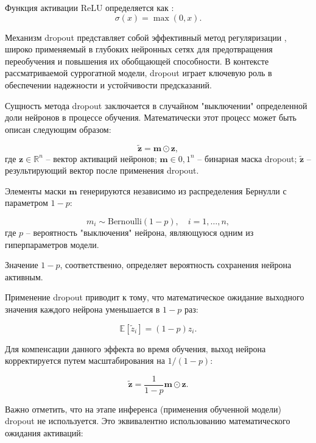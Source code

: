 Функция активации ReLU определяется как \cite*{nair2010rectified}:
\begin{equation*}
    \sigma(x) = \max(0, x).
\end{equation*}

Механизм dropout представляет собой эффективный метод регуляризации \cite*{srivastava2014dropout},
широко применяемый в глубоких нейронных сетях для предотвращения переобучения
и повышения их обобщающей способности. В контексте рассматриваемой суррогатной
модели, dropout играет ключевую роль в обеспечении надежности
и устойчивости предсказаний.

Сущность метода dropout заключается в случайном "выключении" определенной
доли нейронов в процессе обучения. Математически этот процесс может быть описан
следующим образом:

\begin{equation*}
    \tilde{\mathbf{z}} = \mathbf{m} \odot \mathbf{z},
\end{equation*}
где $\mathbf{z} \in \mathbb{R}^n$ -- вектор активаций нейронов;
$\mathbf{m} \in {0, 1}^n$ -- бинарная маска dropout;
$\tilde{\mathbf{z}}$ -- результирующий вектор после применения dropout.

Элементы маски $\mathbf{m}$ генерируются независимо из распределения Бернулли с параметром $1-p$:

\begin{equation*}
    m_i \sim \text{Bernoulli}(1-p), \quad i = 1, \ldots, n,
\end{equation*}
где $p$ -- вероятность "выключения" нейрона, являющуюся одним из гиперпараметров модели.

Значение $1-p$, соответственно, определяет вероятность сохранения нейрона активным.

Применение dropout приводит к тому, что математическое
ожидание выходного значения каждого нейрона уменьшается в $1-p$ раз:

\begin{equation*}
    \mathbb{E}[\tilde{z}_i] = (1-p)z_i.
\end{equation*}

Для компенсации данного эффекта во время обучения, выход нейрона
корректируется путем масштабирования на $1/(1-p)$:

\begin{equation}
    \tilde{\mathbf{z}} = \frac{1}{1-p}\mathbf{m} \odot \mathbf{z}.
\end{equation}

Важно отметить, что на этапе инференса (применения обученной модели)
dropout не используется. Это эквивалентно использованию математического ожидания активаций:


